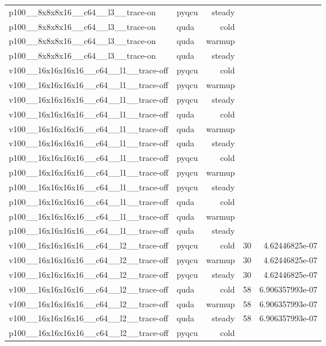 \begin{table}[htbp]
\begin{tabular}{@{}llrrr@{}}
p100\_\_8x8x8x16\_\_c64\_\_l3\_\_trace-on & pyqcu & steady &  &  \\
p100\_\_8x8x8x16\_\_c64\_\_l3\_\_trace-on & quda & cold &  &  \\
p100\_\_8x8x8x16\_\_c64\_\_l3\_\_trace-on & quda & warmup &  &  \\
p100\_\_8x8x8x16\_\_c64\_\_l3\_\_trace-on & quda & steady &  &  \\
v100\_\_16x16x16x16\_\_c64\_\_l1\_\_trace-off & pyqcu & cold &  &  \\
v100\_\_16x16x16x16\_\_c64\_\_l1\_\_trace-off & pyqcu & warmup &  &  \\
v100\_\_16x16x16x16\_\_c64\_\_l1\_\_trace-off & pyqcu & steady &  &  \\
v100\_\_16x16x16x16\_\_c64\_\_l1\_\_trace-off & quda & cold &  &  \\
v100\_\_16x16x16x16\_\_c64\_\_l1\_\_trace-off & quda & warmup &  &  \\
v100\_\_16x16x16x16\_\_c64\_\_l1\_\_trace-off & quda & steady &  &  \\
p100\_\_16x16x16x16\_\_c64\_\_l1\_\_trace-off & pyqcu & cold &  &  \\
p100\_\_16x16x16x16\_\_c64\_\_l1\_\_trace-off & pyqcu & warmup &  &  \\
p100\_\_16x16x16x16\_\_c64\_\_l1\_\_trace-off & pyqcu & steady &  &  \\
p100\_\_16x16x16x16\_\_c64\_\_l1\_\_trace-off & quda & cold &  &  \\
p100\_\_16x16x16x16\_\_c64\_\_l1\_\_trace-off & quda & warmup &  &  \\
p100\_\_16x16x16x16\_\_c64\_\_l1\_\_trace-off & quda & steady &  &  \\
v100\_\_16x16x16x16\_\_c64\_\_l2\_\_trace-off & pyqcu & cold & 30 & 4.62446825e-07 \\
v100\_\_16x16x16x16\_\_c64\_\_l2\_\_trace-off & pyqcu & warmup & 30 & 4.62446825e-07 \\
v100\_\_16x16x16x16\_\_c64\_\_l2\_\_trace-off & pyqcu & steady & 30 & 4.62446825e-07 \\
v100\_\_16x16x16x16\_\_c64\_\_l2\_\_trace-off & quda & cold & 58 & 6.906357993e-07 \\
v100\_\_16x16x16x16\_\_c64\_\_l2\_\_trace-off & quda & warmup & 58 & 6.906357993e-07 \\
v100\_\_16x16x16x16\_\_c64\_\_l2\_\_trace-off & quda & steady & 58 & 6.906357993e-07 \\
p100\_\_16x16x16x16\_\_c64\_\_l2\_\_trace-off & pyqcu & cold &  &  \\

\end{tabular}
\end{table}
